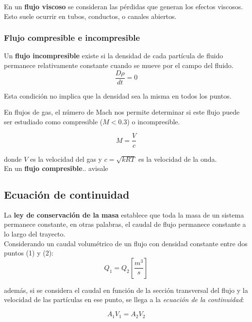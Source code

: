 En un \textbf{flujo viscoso} se consideran las pérdidas que generan los efectos viscosos. Esto suele ocurrir en tubos, conductos, o canales abiertos. 

\subsubsection{Flujo compresible e incompresible}
		
Un \textbf{flujo incompresible} existe si la densidad de cada partícula de fluido permanece relativamente constante cuando se mueve por el campo del fluido.
\begin{equation*}
	\dfrac{D \rho}{dt} = 0
\end{equation*}

Esta condición no implica que la densidad sea la misma en todos los puntos.

En flujos de gas, el número de Mach nos permite determinar si este flujo puede ser estudiado como compresible ($M < 0.3$) o incompresible.

\begin{equation*}
	M = \dfrac{V}{c}
\end{equation*}

donde $V$ es la velocidad del gas y $c=\sqrt{k R T}$ es la velocidad de la onda.\\


En un \textbf{flujo compresible}.. avisale


\subsection{Ecuación de continuidad}

La \textbf{ley de conservación de la masa} establece que toda la masa de un sistema permanece constante, en otras palabras, el caudal de flujo permanece constante a lo largo del trayecto.\\


Considerando un caudal volumétrico de un flujo con densidad constante entre dos puntos (1) y (2):
\begin{equation*}
	Q_1 = Q_2 \left[\dfrac{m^3}{s}\right]
\end{equation*}

además, si se considera el caudal en función de la sección transversal del flujo y la velocidad de las partículas en ese punto, se llega a la \emph{ecuación de la continuidad}:

\begin{equation}
	A_1  V_1 = A_2 V_2
	\label{eq:continuidad-1}
\end{equation}


